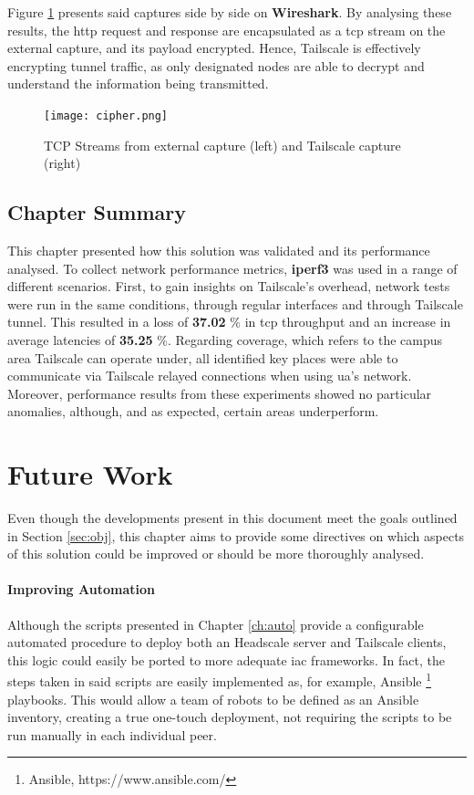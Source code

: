 \documentclass[11pt,twoside,a4paper]{report}
\begin{document}
Figure \ref{fig:cipher} presents said captures side by side on \textbf{Wireshark}. By analysing these results, the \ac{http} request and response are encapsulated as a \ac{tcp} stream on the external capture, and its payload encrypted. Hence, Tailscale is effectively encrypting tunnel traffic, as only designated nodes are able to decrypt and understand the information being transmitted.



\begin{figure}[h]
\centering
  \texttt{[image: cipher.png]}
  \caption{TCP Streams from external capture (left) and Tailscale capture (right)}
  \label{fig:cipher}
\end{figure}

\section{Chapter Summary}

This chapter presented how this solution was validated and its performance analysed. To collect network performance metrics, \textbf{iperf3} was used in a range of different scenarios. First, to gain insights on Tailscale's overhead, network tests were run in the same conditions, through regular interfaces and through Tailscale tunnel. This resulted in a loss of \textbf{37.02} \% in \ac{tcp} throughput and an increase in average latencies of \textbf{35.25} \%. Regarding coverage, which refers to the campus area Tailscale can operate under, all identified key places were able to communicate via Tailscale relayed connections when using \ac{ua}'s network. Moreover, performance results from these experiments showed no particular anomalies, although, and as expected, certain areas underperform.

\chapter{Future Work}

Even though the developments present in this document meet the goals outlined in Section \ref{sec:obj}, this chapter aims to provide some directives on which aspects of this solution could be improved or should be more thoroughly analysed.

\subsubsection{Improving Automation}

Although the scripts presented in Chapter \ref{ch:auto} provide a configurable automated procedure to deploy both an Headscale server and Tailscale clients, this logic could easily be ported to more adequate \ac{iac} frameworks. In fact, the steps taken in said scripts are easily implemented as, for example, Ansible \footnote{Ansible, https://www.ansible.com/} playbooks. This would allow a team of robots to be defined as an Ansible inventory, creating a true one-touch deployment, not requiring the scripts to be run manually in each individual peer.
\end{document}
